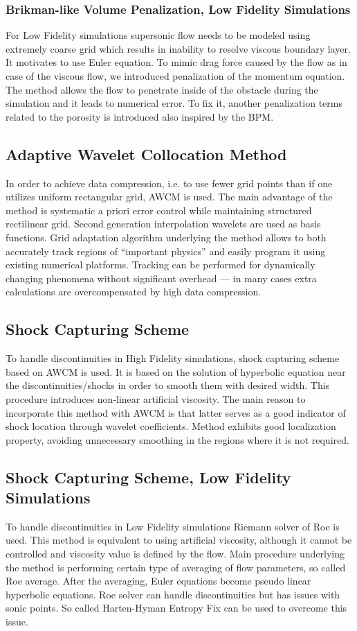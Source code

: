 \subsubsection{Brikman-like Volume Penalization, Low Fidelity Simulations}
For Low Fidelity simulations supersonic flow needs to be modeled using extremely coarse grid which results in inability to resolve viscous boundary layer. It motivates to use Euler equation. To mimic drag force caused by the flow as in case of the viscous flow, we introduced penalization of the momentum equation. The method allows the flow to penetrate inside of the obstacle during the simulation and it leads to numerical error. To fix it, another penalization terms related to the porosity is introduced also inspired by the BPM.

\subsection{Adaptive Wavelet Collocation Method}
In order to achieve data compression, i.e. to use fewer grid points than if one utilizes uniform rectangular grid, AWCM is used. The main advantage of the method is systematic a priori error control while maintaining structured rectilinear grid. Second generation interpolation wavelets are used as basis functions. Grid adaptation algorithm underlying the method allows to both accurately track regions of ``important physics'' and easily program it using existing numerical platforms. Tracking can be performed for dynamically changing phenomena without significant overhead --- in many cases extra calculations are overcompensated by high data compression.

\subsection{Shock Capturing Scheme}
To handle discontinuities in High Fidelity simulations, shock capturing scheme based on AWCM is used. It is based on the solution of hyperbolic equation near the discontinuities/shocks in order to smooth them with desired width. This procedure introduces non-linear artificial viscosity. The main reason to incorporate this method with AWCM is that latter serves as a good indicator of shock location through wavelet coefficients. Method exhibits good localization property, avoiding unnecessary smoothing in the regions where it is not required. 

\subsection{Shock Capturing Scheme, Low Fidelity Simulations}
To handle discontinuities in Low Fidelity simulations Riemann solver of Roe is used. This method is equivalent to using artificial viscosity, although it cannot be controlled and viscosity value is defined by the flow. Main procedure underlying the method is performing certain type of averaging of flow parameters, so called Roe average. After the averaging, Euler equations become pseudo linear hyperbolic equations. Roe solver can handle discontinuities but has issues with sonic points. So called Harten-Hyman Entropy Fix can be used to overcome this issue.


